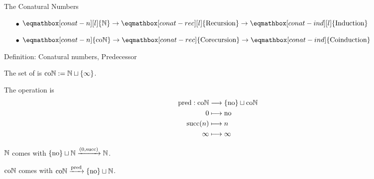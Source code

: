
\begin{frame}{The Conatural Numbers} %

  \begin{itemize}[nosep]
    \item[$\bullet$] $\eqmathbox[conat-n][l]{\N} \to \eqmathbox[conat-rec][l]{\text{Recursion}} \to \eqmathbox[conat-ind][l]{\text{Induction}}$
    \item[$\bullet$] $\eqmathbox[conat-n]{\coN} \to \eqmathbox[conat-rec]{\text{Corecursion}} \to \eqmathbox[conat-ind]{\text{Coinduction}}$
  \end{itemize}

  \pause

  \begin{block}{Definition: Conatural numbers, Predecessor}

    \par The set of  is $\mathrm{co}\mathbb{N} := \mathbb{N} \sqcup \{\infty\}$.
    \par The  operation is
    \begin{align*}
      \operatorname{pred} : \mathrm{co}\mathbb{N}
      &\longrightarrow \{\mathrm{no}\} \sqcup \mathrm{co}\mathbb{N}
      \\
      0
      &\longmapsto \mathrm{no}
      \\
      \operatorname{succ}(n)
      &\longmapsto n
      \\
      \infty
      &\longmapsto \infty
    \end{align*}
  \end{block}

  \pause

  \par $\mathbb{N}$ comes with $\{\mathrm{no}\} \sqcup \mathbb{N} \xrightarrow{(0, \operatorname{succ})} \mathbb{N}$.
  \par $\mathrm{co}\mathbb{N}$ comes with $\mathrm{co}\mathbb{N} \xrightarrow{\operatorname{pred}} \{\mathrm{no}\} \sqcup \mathbb{N}$.

\end{frame}

